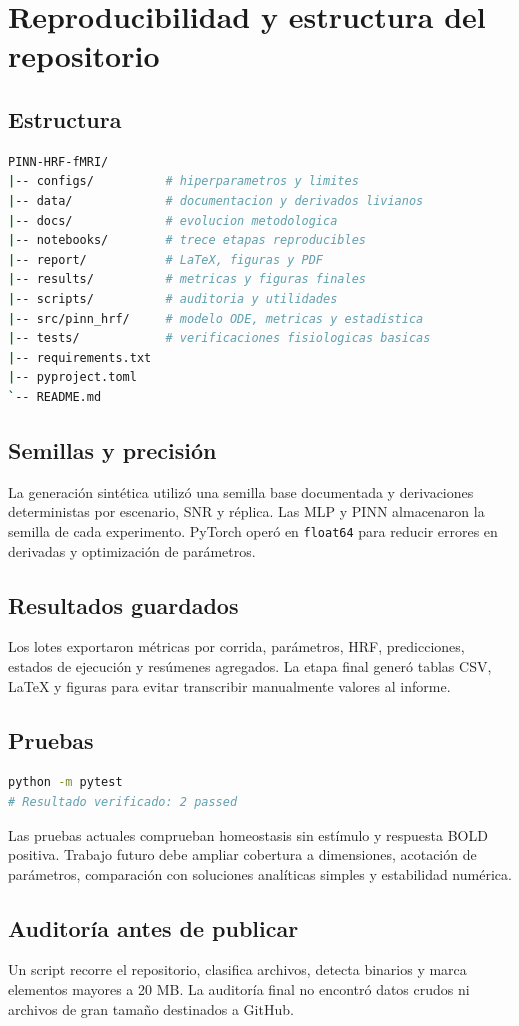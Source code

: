 \chapter{Reproducibilidad y estructura del repositorio}

\section{Estructura}
\begin{lstlisting}[language=bash]
PINN-HRF-fMRI/
|-- configs/          # hiperparametros y limites
|-- data/             # documentacion y derivados livianos
|-- docs/             # evolucion metodologica
|-- notebooks/        # trece etapas reproducibles
|-- report/           # LaTeX, figuras y PDF
|-- results/          # metricas y figuras finales
|-- scripts/          # auditoria y utilidades
|-- src/pinn_hrf/     # modelo ODE, metricas y estadistica
|-- tests/            # verificaciones fisiologicas basicas
|-- requirements.txt
|-- pyproject.toml
`-- README.md
\end{lstlisting}

\section{Semillas y precisión}
La generación sintética utilizó una semilla base documentada y derivaciones deterministas por escenario, SNR y réplica. Las MLP y PINN almacenaron la semilla de cada experimento. PyTorch operó en \texttt{float64} para reducir errores en derivadas y optimización de parámetros.

\section{Resultados guardados}
Los lotes exportaron métricas por corrida, parámetros, HRF, predicciones, estados de ejecución y resúmenes agregados. La etapa final generó tablas CSV, LaTeX y figuras para evitar transcribir manualmente valores al informe.

\section{Pruebas}
\begin{lstlisting}[language=bash]
python -m pytest
# Resultado verificado: 2 passed
\end{lstlisting}
Las pruebas actuales comprueban homeostasis sin estímulo y respuesta BOLD positiva. Trabajo futuro debe ampliar cobertura a dimensiones, acotación de parámetros, comparación con soluciones analíticas simples y estabilidad numérica.

\section{Auditoría antes de publicar}
Un script recorre el repositorio, clasifica archivos, detecta binarios y marca elementos mayores a 20 MB. La auditoría final no encontró datos crudos ni archivos de gran tamaño destinados a GitHub.
